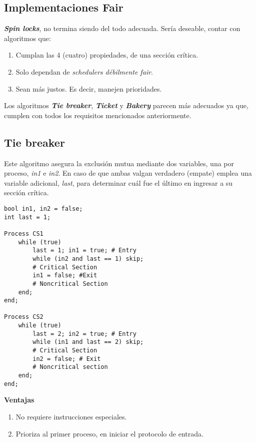 \documentclass[a4paper, 10pt]{report}
\begin{document}
\subsection{Implementaciones Fair}
\textbf{\emph{Spin locks}}, no termina siendo del todo adecuada. Sería deseable, contar con algoritmos que:
\begin{enumerate}
    \item Cumplan las 4 (cuatro) propiedades, de una sección crítica.
    \item Solo dependan de \emph{schedulers débilmente fair}.
    \item Sean más justos. Es decir, manejen prioridades.
\end{enumerate}

Los algoritmos \textbf{\emph{Tie breaker}}, \textbf{\emph{Ticket}} y \textbf{\emph{Bakery}} parecen más adecuados ya que, cumplen con todos los requisitos mencionados anteriormente.

\subsection{Tie breaker}

Este algoritmo asegura la exclusión mutua mediante dos variables, una por proceso, \emph{in1} e \emph{in2}. En caso de que ambas valgan verdadero (empate) emplea una variable adicional, \emph{last}, para determinar cuál fue el último en ingresar a su sección crítica.

\begin{lstlisting}[multicols=2]
bool in1, in2 = false;
int last = 1;
    
Process CS1
    while (true)
        last = 1; in1 = true; # Entry
        while (in2 and last == 1) skip;
        # Critical Section
        in1 = false; #Exit
        # Noncritical Section
    end;
end;
    
Process CS2
    while (true)
        last = 2; in2 = true; # Entry
        while (in1 and last == 2) skip;
        # Critical Section
        in2 = false; # Exit
        # Noncritical section
    end;
end;
\end{lstlisting}

\textbf{Ventajas}
\begin{enumerate}
    \item No requiere instrucciones especiales.
    \item Prioriza al primer proceso, en iniciar el protocolo de entrada.
\end{enumerate}
\end{document}
